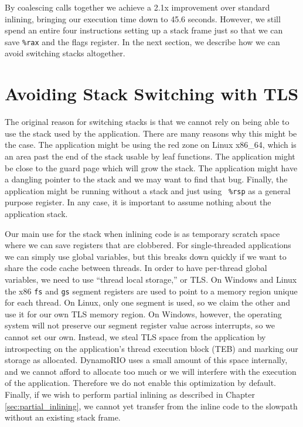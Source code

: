 By coalescing calls together we achieve a 2.1x improvement over standard
inlining, bringing our execution time down to 45.6 seconds.  However, we still
spend an entire four instructions setting up a stack frame just so that we can
save {\tt \%rax} and the flags register.  In the next section, we describe how
we can avoid switching stacks altogether.

\section{Avoiding Stack Switching with TLS}
\label{sec:tls_scratch}

The original reason for switching stacks is that we cannot rely on being able to
use the stack used by the application.  There are many reasons why this might be
the case.  The application might be using the red zone on Linux x86\_64, which
is an area past the end of the stack usable by leaf functions.  The application
might be close to the guard page which will grow the stack.  The application
might have a dangling pointer to the stack and we may want to find that bug.
Finally, the application might be running without a stack and just using {\tt
\%rsp} as a general purpose register.  In any case, it is important to assume
nothing about the application stack.

Our main use for the stack when inlining code is as temporary scratch space
where we can save registers that are clobbered.  For single-threaded
applications we can simply use global variables, but this breaks down quickly if
we want to share the code cache between threads.  In order to have per-thread
global variables, we need to use ``thread local storage,'' or TLS.  On Windows
and Linux the x86 {\tt fs} and {\tt gs} segment registers are used to point to a
memory region unique for each thread.  On Linux, only one segment is used, so we
claim the other and use it for our own TLS memory region.  On Windows, however,
the operating system will not preserve our segment register value across
interrupts, so we cannot set our own.  Instead, we steal TLS space from the
application by introspecting on the application's thread execution block (TEB)
and marking our storage as allocated.\cite{inside_win2k}  DynamoRIO uses a small
amount of this space internally, and we cannot afford to allocate too much or we
will interfere with the execution of the application.  Therefore we do not
enable this optimization by default.  Finally, if we wish to perform partial
inlining as described in Chapter \ref{sec:partial_inlining}, we cannot yet
transfer from the inline code to the slowpath without an existing stack frame.

